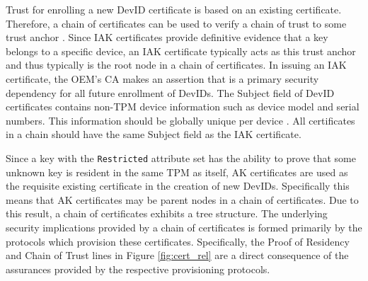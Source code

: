 Trust for enrolling a new DevID certificate is based on an existing certificate. Therefore, a chain of certificates can be used to verify a chain of trust to some trust anchor \cite{DevIDSpec-TCG}. Since IAK certificates provide definitive evidence that a key belongs to a specific device, an IAK certificate typically acts as this trust anchor and thus typically is the root node in a chain of certificates. In issuing an IAK certificate, the OEM's CA makes an assertion that is a primary security dependency for all future enrollment of DevIDs. 
The Subject field of DevID certificates contains non-TPM device information such as device model and serial numbers. This information should be globally unique per device \cite{DevIDSpec-IEEE}. All certificates in a chain should have the same Subject field as the IAK certificate.





Since a key with the \verb|Restricted| attribute set has the ability to prove that some unknown key is resident in the same TPM as itself, AK certificates are used as the requisite existing certificate in the creation of new DevIDs. Specifically this means that AK certificates may be parent nodes in a chain of certificates. Due to this result, a chain of certificates exhibits a tree structure.
The underlying security implications provided by a chain of certificates is formed primarily by the protocols which provision these certificates. Specifically, the Proof of Residency and Chain of Trust lines in Figure \ref{fig:cert_rel} are a direct consequence of the assurances provided by the respective provisioning protocols.



